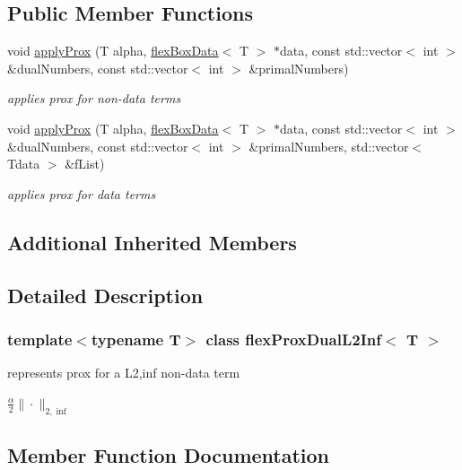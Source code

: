 \subsection*{Public Member Functions}
\begin{DoxyCompactItemize}
\item 
void \hyperlink{classflex_prox_dual_l2_inf_a9462624e3c2cf958ea396b18d1773f9a}{apply\+Prox} (T alpha, \hyperlink{classflex_box_data}{flex\+Box\+Data}$<$ T $>$ $\ast$data, const std\+::vector$<$ int $>$ \&dual\+Numbers, const std\+::vector$<$ int $>$ \&primal\+Numbers)
\begin{DoxyCompactList}\small\item\em applies prox for non-\/data terms \end{DoxyCompactList}\item 
void \hyperlink{classflex_prox_dual_l2_inf_a01510c0adf9e21804b4ab93e728238e6}{apply\+Prox} (T alpha, \hyperlink{classflex_box_data}{flex\+Box\+Data}$<$ T $>$ $\ast$data, const std\+::vector$<$ int $>$ \&dual\+Numbers, const std\+::vector$<$ int $>$ \&primal\+Numbers, std\+::vector$<$ Tdata $>$ \&f\+List)
\begin{DoxyCompactList}\small\item\em applies prox for data terms \end{DoxyCompactList}\end{DoxyCompactItemize}
\subsection*{Additional Inherited Members}


\subsection{Detailed Description}
\subsubsection*{template$<$typename T$>$\newline
class flex\+Prox\+Dual\+L2\+Inf$<$ T $>$}

represents prox for a L2,inf non-\/data term 

$ \frac{\alpha}{2} \|\cdot\|_{2,\inf} $ 

\subsection{Member Function Documentation}
\mbox{\label{classflex_prox_dual_l2_inf_a9462624e3c2cf958ea396b18d1773f9a}} 
